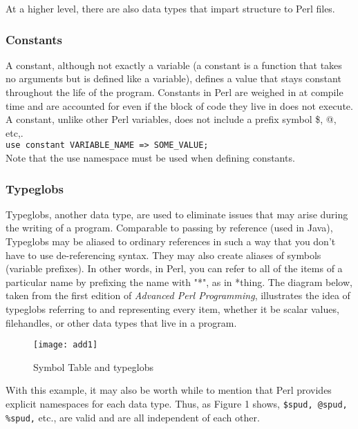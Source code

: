 \documentclass[11pt,a4paper]{article}
\begin{document}
\noindent At a higher level, there are also data types that impart structure to Perl files. 

\subsubsection{Constants}
A constant, although not exactly a variable (a constant is a function that takes no arguments but is defined like a variable), defines a value that stays constant throughout the life of the program. Constants in Perl are weighed in at compile time and are accounted for even if the block of code they live in does not execute. A constant, unlike other Perl variables, does not include a prefix symbol \$, @, etc,. \\

\texttt{use constant VARIABLE\_NAME => SOME\_VALUE;}\\
	

\noindent Note that the use namespace must be used when defining constants.
\subsubsection{Typeglobs}
Typeglobs, another data type, are used to eliminate issues that may arise during the writing of a program. Comparable to passing by reference (used in Java),  Typeglobs may be aliased to ordinary references in such a way that you don't have to use de-referencing syntax\cite{13}. They may also create aliases of symbols (variable prefixes). In other words, in Perl, you can refer to all of the items of a particular name by prefixing the name with "*", as in *thing. The diagram below, taken from the first edition of \textit{Advanced Perl Programming}, illustrates the idea of typeglobs referring to and representing every item, whether it be scalar values, filehandles, or other data types that live in a program.\\

\begin{figure}[h!]
  \center
    \texttt{[image: add1]}
  \begin{center}
  \caption{Symbol Table and typeglobs}
  \cite{13}
  \end{center}
\end{figure}

\noindent With this example, it may also be worth while to mention that Perl provides explicit namespaces for each data type. Thus, as Figure 1 shows, \texttt{\$spud, @spud, \%spud,} etc., are valid and are all independent of each other.
\end{document}
